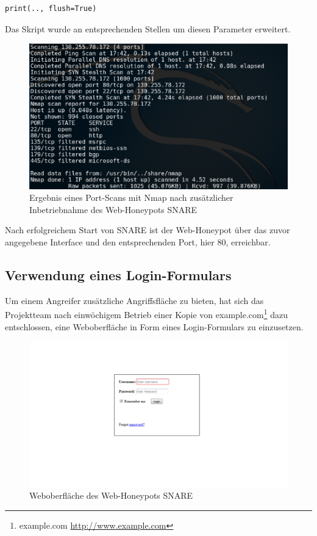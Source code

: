 \begin{lstlisting}[style=customc]
print(.., flush=True)
\end{lstlisting}

Das Skript wurde an entsprechenden Stellen um diesen Parameter erweitert.

\begin{figure}[ht]
	\centering
		\includegraphics[width=1.0\textwidth]{img/nmap_web.png}
	\caption{Ergebnis eines Port-Scans mit Nmap nach zusätzlicher Inbetriebnahme des Web-Honeypots SNARE}
	\label{fig:nmap_web}
\end{figure}

Nach erfolgreichem Start von SNARE ist der Web-Honeypot über das zuvor angegebene Interface und den entsprechenden Port, hier 80, erreichbar.

\subsection{Verwendung eines Login-Formulars}
\label{subsec:Installation und Konfiguration SNARE}

Um einem Angreifer zusätzliche Angriffsfläche zu bieten, hat sich das Projektteam nach einwöchigem Betrieb einer Kopie von example.com\footnote{ example.com \url{http://www.example.com}} dazu entschlossen, eine Weboberfläche in Form eines Login-Formulars zu einzusetzen.

\begin{figure}[ht]
	\centering
		\includegraphics[width=1.0\textwidth]{img/snare_login.png}
	\caption{Weboberfläche des Web-Honeypots SNARE}
	\label{fig:snare_login}
\end{figure}

